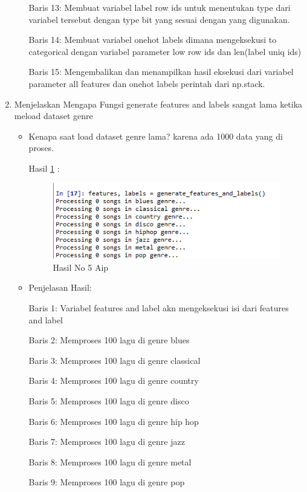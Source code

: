 \begin{enumerate}
\begin{itemize}
\par Baris 13: Membuat variabel label row ids untuk menentukan type dari variabel tersebut dengan type bit yang sesuai dengan yang digunakan.
\par Baris 14: Membuat variabel onehot labels dimana mengeksekusi to categorical dengan variabel parameter low row ids dan len(label uniq ids)
\par Baris 15: Mengembalikan dan menampilkan hasil eksekusi dari variabel parameter all features dan onehot labels perintah dari np.stack.
\end{itemize}
\par
\par
\item Menjelaskan Mengapa Fungsi generate features and labels sangat lama ketika meload dataset genre
\begin{itemize}
\item Kenapa saat load dataset genre lama? karena ada 1000 data yang di proses.

\par Hasil \ref{no5Aip} :
\begin{figure}[ht]
\centering
\includegraphics[scale=0.7]{figures/AIP/no5aip.PNG}
\caption{Hasil No 5 Aip}
\label{no5Aip}
\end{figure}
\item Penjelasan Hasil:
\par Baris 1: Variabel features and label akn mengeksekusi isi dari features and label
\par Baris 2: Memproses 100 lagu di genre blues
\par Baris 3: Memproses 100 lagu di  genre classical
\par Baris 4: Memproses 100 lagu di  genre country
\par Baris 5: Memproses 100 lagu di  genre disco
\par Baris 6: Memproses 100 lagu di  genre  hip hop
\par Baris 7: Memproses 100 lagu di  genre jazz
\par Baris 8: Memproses 100 lagu di  genre metal
\par Baris 9: Memproses 100 lagu di genre pop

\end{itemize}
\end{enumerate}
